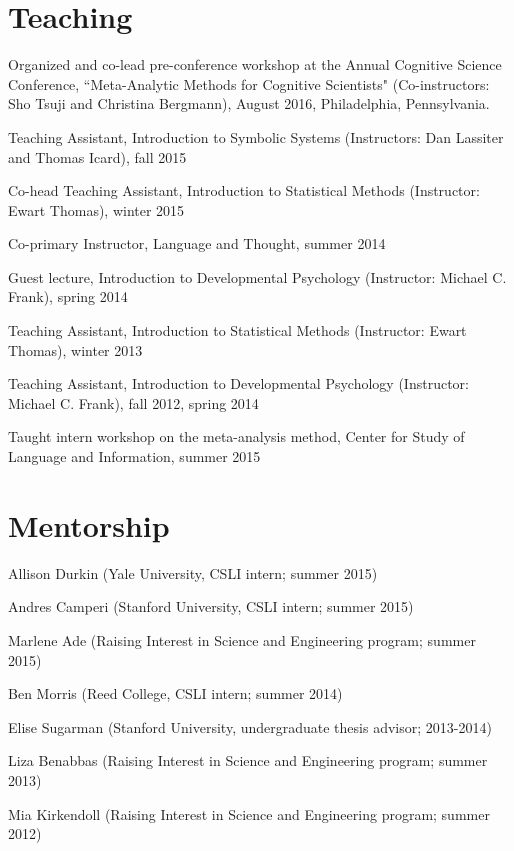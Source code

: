 \documentclass[letterpaper]{article}
\renewenvironment{itemize}{
  \begin{list}{}{
    \setlength{\leftmargin}{1.5em}
  }
}{
  \end{list}
}
\begin{document}
\section*{Teaching}
\begin{itemize}
\item Organized and co-lead pre-conference workshop at the Annual Cognitive Science Conference, ``Meta-Analytic Methods for Cognitive Scientists" (Co-instructors: Sho Tsuji and Christina Bergmann), August 2016, Philadelphia, Pennsylvania. 
\item Teaching Assistant, Introduction to Symbolic Systems (Instructors: Dan Lassiter and Thomas Icard), fall 2015
\item Co-head Teaching Assistant, Introduction to Statistical Methods (Instructor: Ewart Thomas), winter 2015
\item Co-primary Instructor, Language and Thought, summer 2014
\item Guest lecture, Introduction to Developmental Psychology (Instructor: Michael C. Frank), spring 2014
\item Teaching Assistant, Introduction to Statistical Methods (Instructor: Ewart Thomas), winter 2013
\item Teaching Assistant, Introduction to Developmental Psychology (Instructor: Michael C. Frank), fall 2012, spring 2014
\item Taught intern workshop on the meta-analysis method, Center for Study of Language and Information, summer 2015

\end{itemize}

\section*{Mentorship}
\begin{itemize}
\item Allison Durkin (Yale University, CSLI intern; summer 2015)
\item Andres Camperi (Stanford University, CSLI intern; summer 2015)
\item Marlene Ade (Raising Interest in Science and Engineering program; summer 2015)
\item Ben Morris (Reed College, CSLI intern; summer 2014)
\item Elise Sugarman (Stanford University, undergraduate thesis advisor; 2013-2014)
\item Liza Benabbas (Raising Interest in Science and Engineering program; summer 2013)
\item Mia Kirkendoll (Raising Interest in Science and Engineering program; summer 2012)

\end{itemize}
\end{document}

